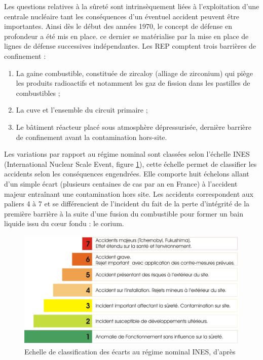 Les questions relatives à la sûreté sont intrinsèquement liées à l'exploitation d'une centrale nucléaire tant les conséquences d'un éventuel accident peuvent être importantes. Ainsi dès le début des années 1970, le concept de défense en profondeur a été mis en place. ce dernier se matérialise par la mise en place de lignes de défense successives indépendantes. Les REP comptent trois barrières de confinement :
\begin{enumerate}
	\item La gaine combustible, constituée de zircaloy (alliage de zirconium) qui piège les produits radioactifs et notamment les gaz de fission dans les pastilles de combustibles ;
	\item La cuve et l'ensemble du circuit primaire ;
	\item Le bâtiment réacteur placé sous atmosphère dépressurisée, dernière barrière de confinement avant la contamination hors-site.
\end{enumerate}
Les variations par rapport au régime nominal sont classées selon l'échelle INES (International Nuclear Scale Event, figure \ref{fig:echelle-ines-article}), cette échelle permet de classifier les accidents selon les conséquences engendrées. Elle comporte huit échelons allant d'un simple écart (plusieurs centaines de cas par an en France) à l'accident majeur entraînant une contamination hors site. Les accidents correspondent aux paliers 4 à 7 et se différencient de l'incident du fait de la perte d'intégrité de la première barrière à la suite d'une fusion du combustible pour former un bain liquide issu du c\oe ur fondu : le corium.
\begin{figure}[H]
	\centering
	\includegraphics[width=1\linewidth]{figure/RTN_ines}
	\caption[Echelle de classification des écarts au régime nominal INES]{Echelle de classification des écarts au régime nominal INES, d'après \cite{noauthor_risque_nodate}}
	\label{fig:echelle-ines-article}
\end{figure}

